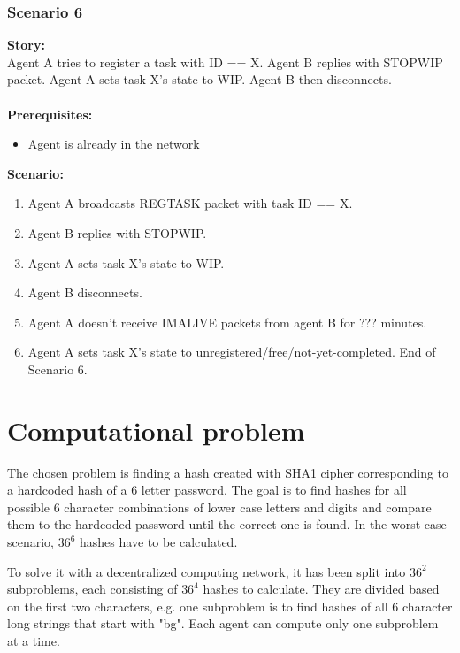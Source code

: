 \documentclass{article}
\begin{document}
\subsubsection{Scenario 6}
\noindent\textbf{Story:} \\
Agent A tries to register a task with ID == X. Agent B replies with STOPWIP packet. Agent A sets task X's state to WIP. Agent B then disconnects. \\\\
\textbf{Prerequisites:}
\begin{itemize}
    \item Agent is already in the network
\end{itemize}
\textbf{Scenario:}
\begin{enumerate}
    \item Agent A broadcasts REGTASK packet with task ID == X.
    \item Agent B replies with STOPWIP.
    \item Agent A sets task X's state to WIP.
    \item Agent B disconnects.
    \item Agent A doesn't receive IMALIVE packets from agent B for ??? minutes.
    \item Agent A sets task X's state to unregistered/free/not-yet-completed. End of Scenario 6.
\end{enumerate}

\section{Computational problem}
The chosen problem is finding a hash created with SHA1 cipher corresponding to a hardcoded hash of a 6 letter password.
The goal is to find hashes for all possible 6 character combinations of lower case letters and digits and compare them to the hardcoded password until the correct one is found.
In the worst case scenario, $36^6$ hashes have to be calculated.

To solve it with a decentralized computing network, it has been split into $36^2$ subproblems,
each consisting of $36^4$ hashes to calculate. They are divided based on the first two characters,
e.g. one subproblem is to find hashes of all 6 character long strings that start with "bg".
Each agent can compute only one subproblem at a time.
\end{document}
